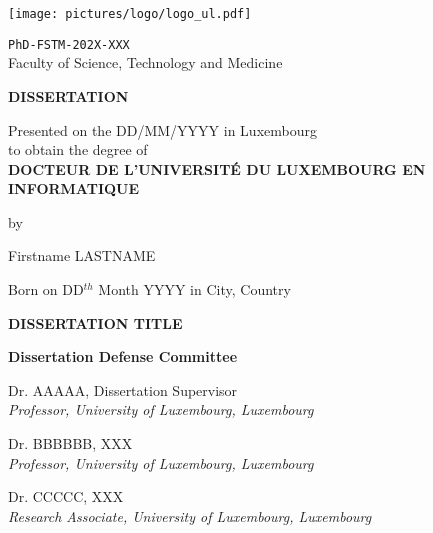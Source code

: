 \begin{titlepage}
 \begin{center}
  \texttt{[image: pictures/logo/logo\_ul.pdf]}
  \vspace{0.3cm}
  
  \texttt{PhD-FSTM-202X-XXX}\\
  Faculty of Science, Technology and Medicine
  \vspace{1cm}  
  
  \textbf{\LARGE{D}\Large{ISSERTATION}}
  \vspace{1cm}
  
Presented on the DD/MM/YYYY in Luxembourg\\
\vspace{0.5cm}
to obtain the degree of\\
\vspace{1cm}
\textbf{\Large{D}\large{OCTEUR DE L'}\Large{U}\large{NIVERSITÉ DU} \Large{L}\large{UXEMBOURG EN }\Large{I}\large{NFORMATIQUE}}

\vspace{0.5cm}
\large{by}

\vspace{0.5cm}
 \Large{Firstname LASTNAME}
 
 \small{Born on DD$^{th}$ Month YYYY in City, Country}
 
\vspace{1cm} 
 \Large{\textbf{DISSERTATION TITLE}}

\vspace{1.5cm}
 \end{center}
\textbf{\large{Dissertation Defense Committee}}

\begin{flushleft}
Dr. AAAAA, Dissertation Supervisor\\
\emph{Professor, University of Luxembourg, Luxembourg}
\vspace{0.3cm}

Dr. BBBBBB, XXX\\
\emph{Professor, University of Luxembourg, Luxembourg}
\vspace{0.3cm}

Dr. CCCCC, XXX\\
\emph{Research Associate, University of Luxembourg, Luxembourg}
\vspace{0.3cm}

\end{flushleft}

\end{titlepage}
